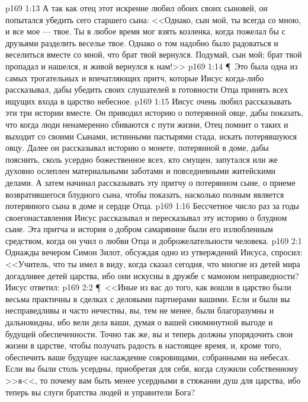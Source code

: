 \vs p169 1:13 А так как отец этот искренне любил обоих своих сыновей, он попытался убедить сего старшего сына: <<Однако, сын мой, ты всегда со мною, и все мое --- твое. Ты в любое время мог взять козленка, когда пожелал бы с друзьями разделить веселье твое. Однако о том надобно было радоваться и веселиться вместе со мной, что брат твой вернулся. Подумай, сын мой; брат твой пропадал и нашелся, и живой вернулся к нам!>>
\vs p169 1:14 \P\ Это была одна из самых трогательных и впечатляющих притч, которые Иисус когда\hyp{}либо рассказывал, дабы убедить своих слушателей в готовности Отца принять всех ищущих входа в царство небесное.
\vs p169 1:15 Иисус очень любил рассказывать эти три истории вместе. Он приводил историю о потерянной овце, дабы показать, что когда люди ненамеренно сбиваются с пути жизни, Отец помнит о таких  и выходит со своими Сынами, истинными пастырями стада, искать потерявшуюся овцу. Далее он рассказывал историю о монете, потерянной в доме, дабы пояснить, сколь усердно божественное  всех, кто смущен, запутался или же духовно ослеплен материальными заботами и повседневными житейскими делами. А затем начинал рассказывать эту притчу о потерянном сыне, о приеме возвратившегося блудного сына, чтобы показать, насколько полным является  потерянного сына в доме и сердце Отца.
\vs p169 1:16 Бессчетное число раз за годы своегонаставления Иисус рассказывал и пересказывал эту историю о блудном сыне. Эта притча и история о добром самарянине были его излюбленным средством, когда он учил о любви Отца и доброжелательности человека.
\vs p169 2:1 Однажды вечером Симон Зилот, обсуждая одно из утверждений Иисуса, спросил: <<Учитель, что ты имел в виду, когда сказал сегодня, что многие из детей мира догадливее детей царства, ибо они искусны в дружбе с мамоном неправедности? Иисус ответил:
\vs p169 2:2 \P\ <<Иные из вас до того, как вошли в царство были весьма практичны в сделках с деловыми партнерами вашими. Если и были вы несправедливы и часто нечестны, вы, тем не менее, были благоразумны и дальновидны, ибо вели дела ваши, думая о вашей сиюминутной выгоде и будущей обеспеченности. Точно так же, вы и теперь должны упорядочить свои жизни в царстве, чтобы получать радость в настоящее время, и, кроме того, обеспечить ваше будущее наслаждение сокровищами, собранными на небесах. Если вы были столь усердны, приобретая для себя, когда служили собственному >>я<<, то почему вам быть менее усердными в стяжании душ для царства, ибо теперь вы слуги братства людей и управители Бога?
